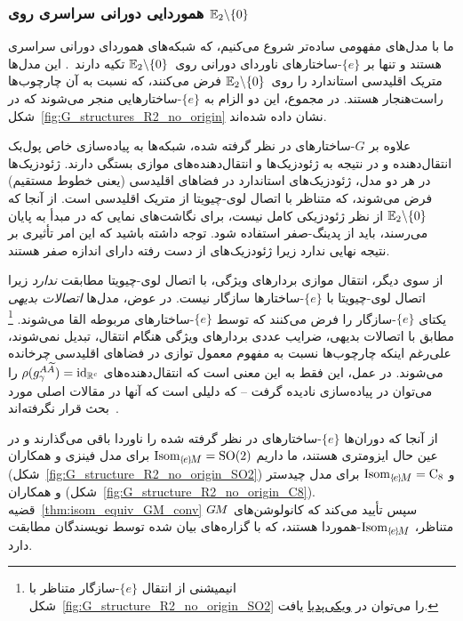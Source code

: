 

\subsubsection*{هموردایی دورانی سراسری روی $\mathbb{E}_2 \backslash \{0\}$}
\label{sec:polar_Euc2_rot}

ما با مدل‌های مفهومی ساده‌تر شروع می‌کنیم، که شبکه‌های هموردای دورانی سراسری هستند و تنها بر $\{e\}$-ساختارهای ناوردای دورانی روی~$\mathbb{E}_2 \backslash \{0\}$ تکیه دارند~\cite{finzi2020generalizing,chidester2019rotation}.
این مدل‌ها متریک اقلیدسی استاندارد را روی~$\mathbb{E}_2 \backslash \{0\}$ فرض می‌کنند، که نسبت به آن چارچوب‌ها راست‌هنجار هستند.
در مجموع، این دو الزام به $\{e\}$-ساختارهایی منجر می‌شوند که در شکل~\ref{fig:G_structures_R2_no_origin} نشان داده شده‌اند.

علاوه بر $G$-ساختارهای در نظر گرفته شده، شبکه‌ها به پیاده‌سازی خاص پول‌بک انتقال‌دهنده و در نتیجه به ژئودزیک‌ها و انتقال‌دهنده‌های موازی بستگی دارند.
ژئودزیک‌ها در هر دو مدل، ژئودزیک‌های استاندارد در فضاهای اقلیدسی (یعنی خطوط مستقیم) فرض می‌شوند، که متناظر با اتصال لوی-چیویتا از متریک اقلیدسی است.
از آنجا که $\mathbb{E}_2 \backslash \{0\}$ از نظر ژئودزیکی کامل نیست، برای نگاشت‌های نمایی که در مبدأ به پایان می‌رسند، باید از پدینگ-صفر استفاده شود.
توجه داشته باشید که این امر تأثیری بر نتیجه نهایی ندارد زیرا ژئودزیک‌های از دست رفته دارای اندازه صفر هستند.


از سوی دیگر، انتقال موازی بردارهای ویژگی، با اتصال لوی-چیویتا مطابقت \emph{ندارد} زیرا اتصال لوی-چیویتا با $\{e\}$-ساختارها سازگار نیست.
در عوض، مدل‌ها \emph{اتصالات بدیهی} یکتای $\{e\}$-سازگار را فرض می‌کنند که توسط $\{e\}$-ساختارهای مربوطه القا می‌شوند.%
\footnote{
\label{footnote:punctured_Euclidean_transport}
	انیمیشنی از انتقال $\{e\}$-سازگار متناظر با شکل~\ref{fig:G_structure_R2_no_origin_SO2} را می‌توان در
	\href{https://en.wikipedia.org/wiki/Levi-Civita_connection\#Parallel_transport}{\underline{ویکی‌پدیا}} یافت.
}
مطابق با اتصالات بدیهی، ضرایب عددی بردارهای ویژگی هنگام انتقال، تبدیل نمی‌شوند، علی‌رغم اینکه چارچوب‌ها نسبت به مفهوم معمول توازی در فضاهای اقلیدسی چرخانده می‌شوند.
در عمل، این فقط به این معنی است که انتقال‌دهنده‌های $\rho(g^{A\widetilde{A}}_\gamma) = \mathrm{id}_{\mathbb{R}^c}$ را می‌توان در پیاده‌سازی نادیده گرفت -- که دلیلی است که آنها در مقالات اصلی مورد بحث قرار نگرفته‌اند~\cite{finzi2020generalizing,chidester2019rotation}.


از آنجا که دوران‌ها $\{e\}$-ساختارهای در نظر گرفته شده را ناوردا باقی می‌گذارند و در عین حال ایزومتری هستند، ما داریم
$\IsomeM = \SO2$ برای مدل فینزی و همکاران
 \cite{finzi2020generalizing} (شکل~\ref{fig:G_structure_R2_no_origin_SO2}) و
$\IsomeM = \operatorname{C}_8$ برای مدل چیدستر و همکاران \cite{chidester2019rotation} (شکل~\ref{fig:G_structure_R2_no_origin_C8}).
قضیه~\ref{thm:isom_equiv_GM_conv} سپس تأیید می‌کند که کانولوشن‌های $G\mkern-1.4muM$ متناظر، $\IsomeM$-هموردا هستند، که با گزاره‌های بیان شده توسط نویسندگان مطابقت دارد.

